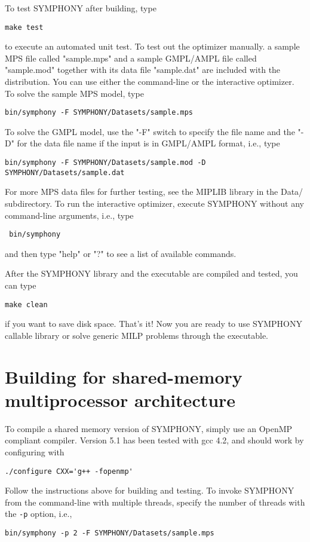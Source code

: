 To test SYMPHONY after building, type
\begin{verbatim}
make test
\end{verbatim}
to execute an automated unit test. To test out the optimizer manually. a
sample MPS file called "sample.mps" and a sample GMPL/AMPL file called
"sample.mod" together with its data file "sample.dat" are included with the
distribution. You can use either the command-line or the interactive
optimizer. To solve the sample MPS model, type 
\begin{verbatim}
bin/symphony -F SYMPHONY/Datasets/sample.mps
\end{verbatim}
To solve the GMPL model, use the "-F" switch to specify the file
name and the "-D" for the data file name if the input is in GMPL/AMPL format,
i.e., type
\begin{verbatim}
bin/symphony -F SYMPHONY/Datasets/sample.mod -D SYMPHONY/Datasets/sample.dat
\end{verbatim}
For more MPS data files for further testing, see the MIPLIB library in the
Data/ subdirectory. To run the interactive optimizer, execute SYMPHONY without
any command-line arguments, i.e., type
\begin{verbatim}
 bin/symphony 
\end{verbatim}
and then type "help" or "?" to see a list of available commands.

After the SYMPHONY library and the executable are compiled and tested, you
can type
\begin{verbatim}
make clean 
\end{verbatim}
if you want to save disk space. That's it! Now you are ready to use SYMPHONY
callable library or solve generic MILP problems through the executable.

\section{Building for shared-memory multiprocessor architecture}

To compile a shared memory version of SYMPHONY, simply use an OpenMP compliant
compiler. Version 5.1 has been tested with gcc 4.2, and should work by
configuring with
\begin{verbatim}
./configure CXX='g++ -fopenmp'
\end{verbatim}
Follow the instructions above for building and testing. To invoke SYMPHONY
from the command-line with multiple threads, specify the number of threads
with the \texttt{-p} option, i.e.,
\begin{verbatim}
bin/symphony -p 2 -F SYMPHONY/Datasets/sample.mps
\end{verbatim}

